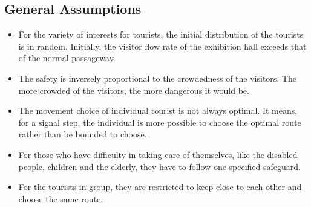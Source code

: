 \documentclass{mcmthesis}
\begin{document}
\subsection{General Assumptions}
\begin{itemize}
	\item For the variety of interests for tourists, the initial distribution of the tourists is in random. Initially, the visitor flow rate of the exhibition hall exceeds that of the normal passageway.
	\item The safety is inversely proportional to the crowdedness of the visitors. The more crowded of the visitors, the more dangerous it would be.
	\item The movement choice of individual tourist is not always optimal. It means, for a signal step, the individual is more possible to choose the optimal route rather than be bounded to choose.
	\item For those who have difficulty in taking care of themselves, like the disabled people, children and the elderly, they have to follow one specified safeguard.
	\item For the tourists in group, they are restricted to keep close to each other and choose the same route.
\end{itemize}
\newpage
\end{document}

